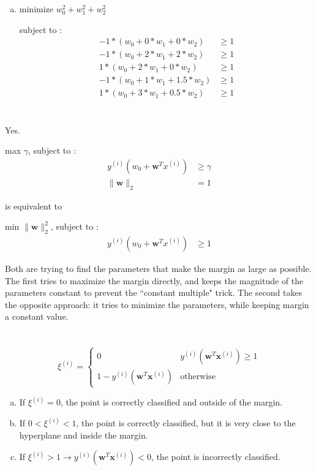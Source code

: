 \documentclass[12pt]{article}
\begin{document}
\begin{enumerate}[(a)]
		\item minimize $ w_0^2 + w_1^2 + w_2^2 $
		\par subject to :
		\begin{align*}
			-1 *(w_0 + 0 * w_1 + 0 * w_2) &\geq 1\\
			-1 *(w_0 + 2 * w_1 + 2 * w_2) &\geq 1\\
			1 *(w_0 + 2 * w_1 + 0 * w_2) &\geq 1\\
			-1 *(w_0 + 1 * w_1 + 1.5 * w_2) &\geq 1\\
			1 *(w_0 + 3 * w_1 + 0.5 * w_2) &\geq 1
		\end{align*}
\end{enumerate}
\newpage

\section{}
Yes. 
\par max $ \gamma $, subject to :
\begin{align*}
	y^{(i)}(w_0+\mathbf{w}^Tx^{(i)}) &\geq \gamma\\
	\|\mathbf{w}\|_{2} &= 1
\end{align*}

is equivalent to 
\par min $ \|\mathbf{w}\|_{2}^{2} $, subject to :
\begin{align*}
	y^{(i)}(w_0+\mathbf{w}^Tx^{(i)}) &\geq 1
\end{align*}
\par Both are trying to find the parameters that make the margin as large as possible. The first tries to maximize the margin directly, and keeps the magnitude of the parameters constant to prevent the ``constant multiple" trick. The second takes the opposite approach: it tries to minimize the parameters, while keeping margin a constant value.
\newpage

\section{}
\[ \xi^{(i)} =  \begin{cases}
	0 & y^{(i)}(\mathbf{w}^T\mathbf{x}^{(i)}) \geq 1\\
	1 - y^{(i)}(\mathbf{w}^T\mathbf{x}^{(i)}) & \text{otherwise}
\end{cases} \]
\begin{enumerate}[(a)]
	\item If $ \xi^{(i)} = 0$, the point is correctly classified and outside of the margin.
	
	\item If $ 0 < \xi^{(i)} < 1$, the point is correctly classified, but it is very close to the hyperplane and inside the margin.
	
	\item If $ \xi^{(i)} > 1 \rightarrow y^{(i)}(\mathbf{w}^T\mathbf{x}^{(i)}) < 0$, the point is incorrectly classified. 
\end{enumerate}
\newpage
\end{document}
